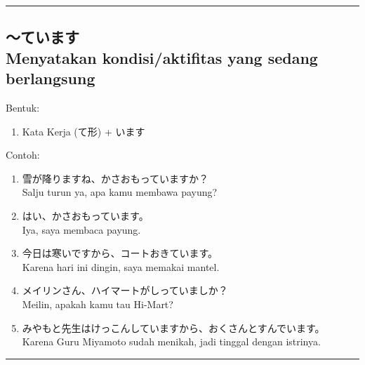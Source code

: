 \vspace{0.2cm}\hrule height 1pt\vspace{0.2cm}


\subsection*{
    ～ています \\
    Menyatakan kondisi/aktifitas yang sedang berlangsung
}
Bentuk:
\begin{enumerate}
    \item Kata Kerja (て形) + います
\end{enumerate}
Contoh: 
\begin{enumerate}
    \item 雪が降りますね、かさおもっていますか？
    \\ Salju turun ya, apa kamu membawa payung?
    \item はい、かさおもっています。
    \\ Iya, saya membaca payung.
    \item 今日は寒いですから、コートおきています。
    \\ Karena hari ini dingin, saya memakai mantel.
    \item メイリンさん、ハイマートがしっていましか？
    \\ Meilin, apakah kamu tau Hi-Mart?
    \item みやもと先生はけっこんしていますから、おくさんとすんでいます。
    \\ Karena Guru Miyamoto sudah menikah, jadi tinggal dengan istrinya.
\end{enumerate}

\vspace{0.2cm}\hrule height 1pt\vspace{0.2cm}

\newpage
